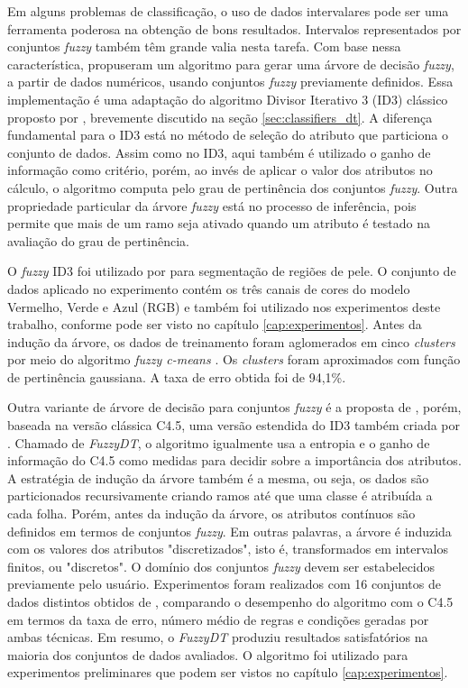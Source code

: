 Em alguns problemas de classificação, o uso de dados intervalares pode ser uma ferramenta poderosa na obtenção de bons resultados. Intervalos representados por conjuntos \emph{fuzzy} também têm grande valia nesta tarefa. Com base nessa característica, \citet{umano:94} propuseram um algoritmo para gerar uma árvore de decisão \emph{fuzzy}, a partir de dados numéricos, usando conjuntos \emph{fuzzy} previamente definidos. Essa implementação é uma adaptação do algoritmo Divisor Iterativo 3 (ID3) clássico proposto por \citet{quinlan:86}, brevemente discutido na seção \ref{sec:classifiers_dt}. A diferença fundamental para o ID3 está no método de seleção do atributo que particiona o conjunto de dados. Assim como no ID3, aqui também é utilizado o ganho de informação como critério, porém, ao invés de aplicar o valor dos atributos no cálculo, o algoritmo computa pelo grau de pertinência dos conjuntos \emph{fuzzy}. Outra propriedade particular da árvore \emph{fuzzy} está no processo de inferência, pois permite que mais de um ramo seja ativado quando um atributo é testado na avaliação do grau de pertinência.

O \emph{fuzzy} ID3 foi utilizado por \citet{bhatt:09} para segmentação de regiões de pele. O conjunto de dados aplicado no experimento contém os três canais de cores do modelo Vermelho, Verde e Azul (RGB) e também foi utilizado nos experimentos deste trabalho, conforme pode ser visto no capítulo \ref{cap:experimentos}. Antes da indução da árvore, os dados de treinamento foram aglomerados em cinco \emph{clusters} por meio do algoritmo \emph{fuzzy c-means} \citep{bezdek:84}. Os \emph{clusters} foram aproximados com função de pertinência gaussiana. A taxa de erro obtida foi de 94,1\%.

Outra variante de árvore de decisão para conjuntos \emph{fuzzy} é a proposta de \citet{cintra:13}, porém, baseada na versão clássica C4.5, uma versão estendida do ID3 também criada por \citet{quinlan:93}. Chamado de \emph{FuzzyDT}, o algoritmo igualmente usa a entropia e o ganho de informação do C4.5 como medidas para decidir sobre a importância dos atributos. A estratégia de indução da árvore também é a mesma, ou seja, os dados são particionados recursivamente criando ramos até que uma classe é atribuída a cada folha. Porém, antes da indução da árvore, os atributos contínuos são definidos em termos de conjuntos \emph{fuzzy}. Em outras palavras, a árvore é induzida com os valores dos atributos "discretizados", isto é, transformados em intervalos finitos, ou "discretos". O domínio dos conjuntos \emph{fuzzy} devem ser estabelecidos previamente pelo usuário. Experimentos foram realizados com 16 conjuntos de dados distintos obtidos de \citet{lichman:13}, comparando o desempenho do algoritmo com o C4.5 em termos da taxa de erro, número médio de regras e condições geradas por ambas técnicas. Em resumo, o \emph{FuzzyDT} produziu resultados satisfatórios na maioria dos conjuntos de dados avaliados. O algoritmo foi utilizado para experimentos preliminares que podem ser vistos no capítulo \ref{cap:experimentos}.

